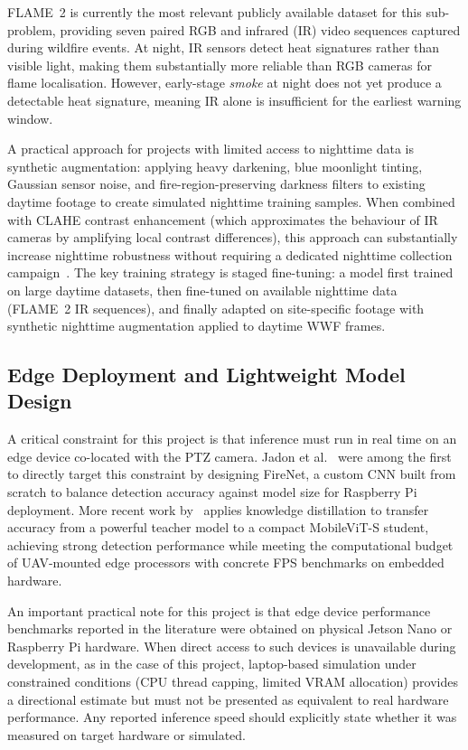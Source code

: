 \documentclass[11pt,twocolumn]{article}
\begin{document}
FLAME~2 is currently the most relevant publicly available dataset for
this sub-problem, providing seven paired RGB and infrared (IR) video
sequences captured during wildfire events. At night, IR sensors
detect heat signatures rather than visible light, making them
substantially more reliable than RGB cameras for flame localisation.
However, early-stage \textit{smoke} at night does not yet produce
a detectable heat signature, meaning IR alone is insufficient for
the earliest warning window.

A practical approach for projects with limited access to nighttime
data is synthetic augmentation: applying heavy darkening, blue
moonlight tinting, Gaussian sensor noise, and fire-region-preserving
darkness filters to existing daytime footage to create simulated
nighttime training samples. When combined with CLAHE contrast
enhancement (which approximates the behaviour of IR cameras by
amplifying local contrast differences), this approach can
substantially increase nighttime robustness without requiring a
dedicated nighttime collection campaign~\cite{kd2025}. The key
training strategy is staged fine-tuning: a model first trained on
large daytime datasets, then fine-tuned on available nighttime data
(FLAME~2 IR sequences), and finally adapted on site-specific footage
with synthetic nighttime augmentation applied to daytime WWF frames.

\subsection{Edge Deployment and Lightweight Model Design}

A critical constraint for this project is that inference must run in
real time on an edge device co-located with the PTZ camera.
Jadon et al.~\cite{firenet2019} were among the first to directly
target this constraint by designing FireNet, a custom CNN built from
scratch to balance detection accuracy against model size for
Raspberry Pi deployment. More recent work by~\cite{kd2025} applies
knowledge distillation to transfer accuracy from a powerful teacher
model to a compact MobileViT-S student, achieving strong detection
performance while meeting the computational budget of UAV-mounted
edge processors with concrete FPS benchmarks on embedded hardware.

An important practical note for this project is that edge device
performance benchmarks reported in the literature were obtained on
physical Jetson Nano or Raspberry Pi hardware. When direct access to
such devices is unavailable during development, as in the case of this project, laptop-based
simulation under constrained conditions (CPU thread capping, limited
VRAM allocation) provides a directional estimate but must not be
presented as equivalent to real hardware performance. Any reported
inference speed should explicitly state whether it was measured on
target hardware or simulated.
\end{document}
